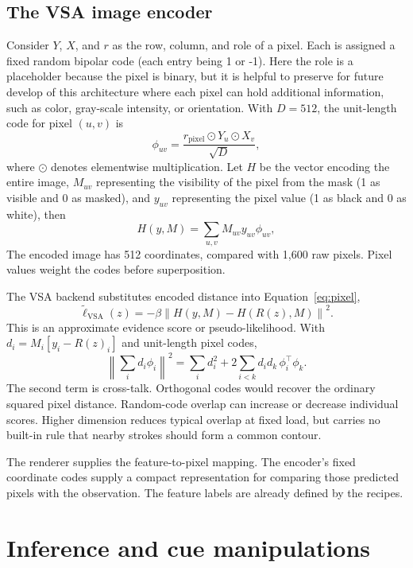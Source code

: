 \documentclass[11pt,letterpaper]{article}
\begin{document}
\subsection{The VSA image encoder}
Consider $Y$, $X$, and $r$ as the row, column, and role of a pixel. Each is assigned a fixed random bipolar code (each entry being 1 or -1). Here the role is a placeholder because the pixel is binary, but it is helpful to preserve for future develop of this architecture where each pixel can hold additional information, such as color, gray-scale intensity, or orientation. With $D=512$, the unit-length code for pixel $(u,v)$ is
\begin{equation}
\phi_{uv}=\frac{r_{\mathrm{pixel}}\odot Y_u\odot X_v}{\sqrt D},
\end{equation}
where $\odot$ denotes elementwise multiplication.
Let $H$ be the vector encoding the entire image, $M_{uv}$ representing the visibility of the pixel from the mask (1 as visible and 0 as masked), and $y_{uv}$ representing the pixel value (1 as black and 0 as white), then
\begin{equation}
H(y,M)=\sum_{u,v}M_{uv}y_{uv}\phi_{uv},
\end{equation}
The encoded image has 512 coordinates, compared with 1,600 raw pixels. Pixel values weight the codes before superposition.

The VSA backend substitutes encoded distance into Equation~\eqref{eq:pixel},
\begin{equation}
\widetilde\ell_{\mathrm{VSA}}(z)
=-\beta\left\|H(y,M)-H(R(z),M)\right\|^2.
\label{eq:vsa}
\end{equation}
This is an approximate evidence score or pseudo-likelihood. With $d_i=M_i[y_i-R(z)_i]$ and unit-length pixel codes,
\begin{equation}
\left\|\sum_i d_i\phi_i\right\|^2
=\sum_i d_i^2+2\sum_{i<k}d_i d_k\,\phi_i^\top\phi_k.
\end{equation}
The second term is cross-talk. Orthogonal codes would recover the ordinary squared pixel distance. Random-code overlap can increase or decrease individual scores. Higher dimension reduces typical overlap at fixed load, but carries no built-in rule that nearby strokes should form a common contour.

The renderer supplies the feature-to-pixel mapping. The encoder's fixed coordinate codes supply a compact representation for comparing those predicted pixels with the observation. The feature labels are already defined by the recipes.

\section{Inference and cue manipulations}
\end{document}
